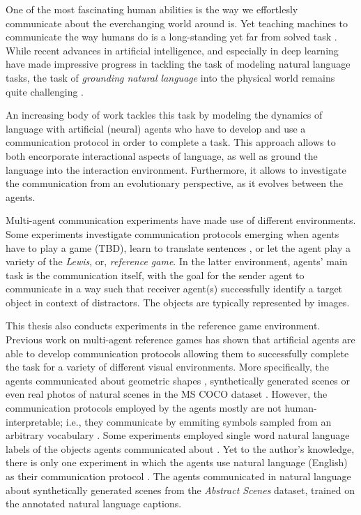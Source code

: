 One of the most fascinating human abilities is the way we effortlesly communicate about the everchanging world around is. Yet teaching machines to communicate the way humans do is a long-standing yet far from solved task . While recent advances in artificial intelligence, and especially in deep learning have made impressive progress in tackling the task of modeling natural language tasks, the task of \textit{grounding natural language} into the physical world remains quite challenging .

An increasing body of work tackles this task by modeling the dynamics of language with artificial (neural) agents who have to develop and use a communication protocol in order to complete a task. This approach allows to both encorporate interactional aspects of language, as well as ground the language into the interaction environment. Furthermore, it allows to investigate the communication from an evolutionary perspective, as it evolves between the agents.

Multi-agent communication experiments have made use of different environments. Some experiments investigate communication protocols emerging when agents have to play a game (TBD), learn to translate sentences \parencite{lee2019countering}, or let the agent play a variety of the \textit{Lewis}, or, \textit{reference game}. In the latter environment, agents' main task is the communication itself, with the goal for the sender agent to communicate in a way such that receiver agent(s) successfully identify a target object in context of distractors. The objects are typically represented by images. 

This thesis also conducts experiments in the reference game environment. Previous work on multi-agent reference games has shown that artificial agents are able to develop communication protocols allowing them to successfully complete the task \parencite{lazaridou2016multi} for a variety of different visual environments. More specifically, the agents communicated about geometric shapes , synthetically generated scenes \parencite{lazaridou2020multi} or even real photos of natural scenes in the MS COCO dataset \parencite{lazaridou2016multi, lin2014microsoft}. However, the communication protocols employed by the agents mostly are not human-interpretable; i.e., they communicate by emmiting symbols sampled from an arbitrary vocabulary . Some experiments employed single word natural language labels of the objects agents communicated about \parencite{lazaridou2016multi}. Yet to the author's knowledge, there is only one experiment in which the agents use natural language (English) as their communication protocol \parencite{lazaridou2020multi} . The agents communicated in natural language about synthetically generated scenes from the \textit{Abstract Scenes} dataset, trained on the annotated natural language captions. 

